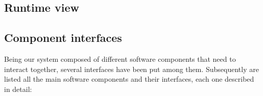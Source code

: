\subsection{Runtime view}
\subsection{Component interfaces}
Being our system composed of different software components that need to interact together, several interfaces have been put among them.
Subsequently are listed all the main software components and their interfaces, each one described in detail:
